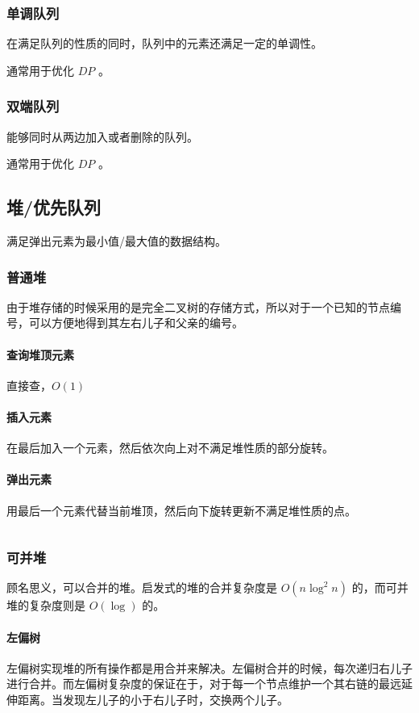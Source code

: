 \documentclass[UTF-8]{ctexart}
\newcommand{\cpp}[1]{\inputminted[bgcolor=bg,breaklines,breakanywhere=true]{c++}{#1}}
\begin{document}
			\subsubsection{单调队列}
			在满足队列的性质的同时，队列中的元素还满足一定的单调性。
	
			通常用于优化 $DP$ 。
			\subsubsection{双端队列}
			能够同时从两边加入或者删除的队列。
	
			通常用于优化 $DP$ 。
		\subsection{堆/优先队列}
		满足弹出元素为最小值/最大值的数据结构。
			\subsubsection{普通堆}
			由于堆存储的时候采用的是完全二叉树的存储方式，所以对于一个已知的节点编号，可以方便地得到其左右儿子和父亲的编号。
				\paragraph{查询堆顶元素} 直接查，$O(1)$
				\paragraph{插入元素} 在最后加入一个元素，然后依次向上对不满足堆性质的部分旋转。
				\paragraph{弹出元素} 用最后一个元素代替当前堆顶，然后向下旋转更新不满足堆性质的点。
			\cpp{code//DataStruct//heap.cpp}
			\subsubsection{可并堆}
			顾名思义，可以合并的堆。启发式的堆的合并复杂度是 $O(n\log^2n)$ 的，而可并堆的复杂度则是 $O(\log)$ 的。
	
				\paragraph{左偏树}	左偏树实现堆的所有操作都是用合并来解决。左偏树合并的时候，每次递归右儿子进行合并。而左偏树复杂度的保证在于，对于每一个节点维护一个其右链的最远延伸距离。当发现左儿子的小于右儿子时，交换两个儿子。
				\cpp{code//DataStruct//leftisttree.cpp}
\end{document}
